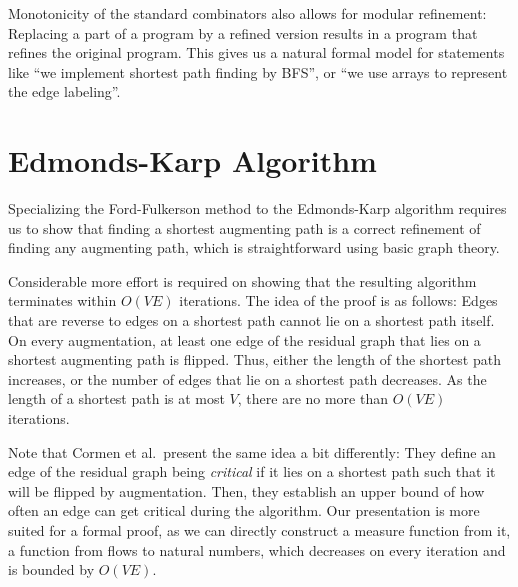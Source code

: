 \documentclass{llncs}
\begin{document}
Monotonicity of the standard combinators also allows for modular refinement: Replacing a part of a program by a refined version
results in a program that refines the original program. This gives us a natural formal model for statements like ``we implement shortest path finding by BFS'', or ``we use arrays to represent the edge labeling''. 

% 
% 
% 
% 
% 
% 
% 
% 




\section{Edmonds-Karp Algorithm}\label{sec:edka}
  Specializing the Ford-Fulkerson method to the Edmonds-Karp algorithm requires us to show that finding a shortest augmenting path is a correct refinement of finding any augmenting path, which is straightforward using basic graph theory.
  
  Considerable more effort is required on showing that the resulting algorithm terminates within $O(VE)$ iterations. 
  The idea of the proof is as follows: Edges that are reverse to edges on a shortest path cannot lie 
  on a shortest path itself.
  On every augmentation, at least one edge of the residual graph that lies on a shortest augmenting path is flipped. Thus, either the length of the shortest path increases,
  or the number of edges that lie on a shortest path decreases. As the length of a shortest path is at most $V$, there are no more than $O(VE)$ iterations.
  
  Note that Cormen et al.~present the same idea a bit differently: They define an edge of the residual graph being \emph{critical} if it lies on a shortest path such that it will be flipped by augmentation. Then, they establish an upper bound of how often an edge can get critical during the algorithm. Our presentation is more suited for a formal proof, as we can directly construct a measure function from it, \ie a function from flows to natural numbers, which decreases on every iteration and is bounded by $O(VE)$. 
  
\end{document}
